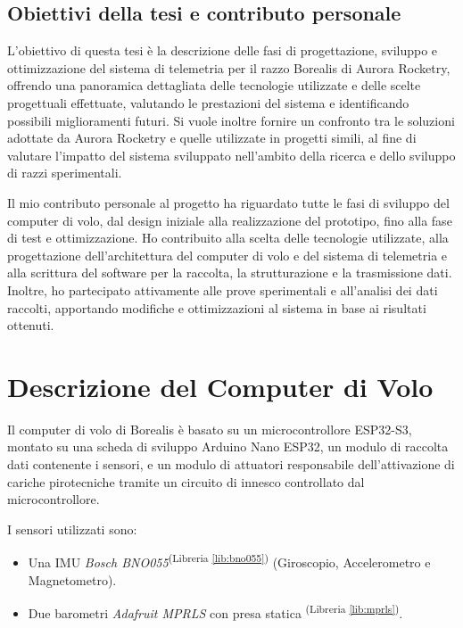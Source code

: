 \documentclass[12pt,a4paper,twoside]{book}
\newcommand{\libref}[1]{\textsuperscript{(Libreria \ref{#1})}}
\begin{document}
\section{Obiettivi della tesi e contributo personale}
L'obiettivo di questa tesi è la descrizione delle fasi di progettazione,
sviluppo e ottimizzazione del sistema di telemetria per il razzo Borealis di
Aurora Rocketry, offrendo una panoramica dettagliata delle tecnologie utilizzate
e delle scelte progettuali effettuate, valutando le prestazioni del sistema e
identificando possibili miglioramenti futuri.
Si vuole inoltre fornire un confronto tra le soluzioni adottate da Aurora
Rocketry e quelle utilizzate in progetti simili, al fine di valutare l'impatto
del sistema sviluppato nell'ambito della ricerca e dello sviluppo di razzi
sperimentali.

Il mio contributo personale al progetto ha riguardato tutte le fasi di sviluppo
del computer di volo, dal design iniziale alla realizzazione del prototipo, fino
alla fase di test e ottimizzazione.
Ho contribuito alla scelta delle tecnologie utilizzate, alla progettazione
dell'architettura del computer di volo e del sistema di telemetria e alla
scrittura del software per la raccolta, la strutturazione e la trasmissione dati.
Inoltre, ho partecipato attivamente alle prove sperimentali e all'analisi dei
dati raccolti, apportando modifiche e ottimizzazioni al sistema in base ai
risultati ottenuti.

\chapter{Descrizione del Computer di Volo} \label{chap:flight-computer}
\pagestyle{plain}

Il computer di volo di Borealis è basato su un microcontrollore ESP32-S3, montato
su una scheda di sviluppo Arduino Nano ESP32, un modulo di raccolta dati contenente
i sensori, e un modulo di attuatori responsabile dell'attivazione di cariche
pirotecniche tramite un circuito di innesco controllato dal microcontrollore.%

I sensori utilizzati sono:
\begin{itemize}
    \item Una \ac{IMU} \emph{Bosch BNO055}\libref{lib:bno055}
          (Giroscopio, Accelerometro e Magnetometro).
    \item Due barometri \emph{Adafruit MPRLS} con presa statica \libref{lib:mprls}.
\end{itemize}
\end{document}
